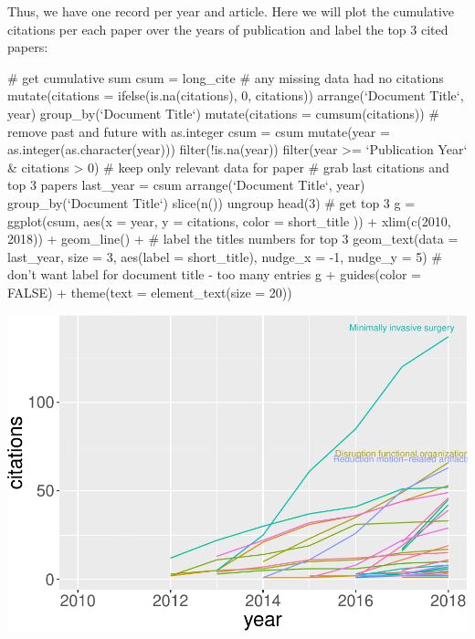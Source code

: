 Thus, we have one record per year and article. Here we will plot the
cumulative citations per each paper over the years of publication and
label the top 3 cited papers:

\begin{Schunk}
\begin{Sinput}
# get cumulative sum
csum = long_cite %
  # any missing data had no citations
  mutate(citations = ifelse(is.na(citations), 0, citations)) %
  arrange(`Document Title`, year) %
  group_by(`Document Title`) %
  mutate(citations = cumsum(citations))
# remove past and future with as.integer
csum = csum %
  mutate(year = as.integer(as.character(year))) %
  filter(!is.na(year)) %
  filter(year >= `Publication Year` & citations > 0) # keep only relevant data for paper
# grab last citations and top 3 papers
last_year = csum %
  arrange(`Document Title`, year) %
  group_by(`Document Title`) %
  slice(n()) %
  ungroup %
  head(3)  # get top 3
g = ggplot(csum, 
           aes(x = year, y = citations, color = short_title  )) +
  xlim(c(2010, 2018)) + geom_line() + 
  # label the titles numbers for top 3
  geom_text(data = last_year, size = 3, aes(label = short_title), 
            nudge_x = -1, nudge_y = 5)
# don't want label for document title - too many entries
g + guides(color = FALSE) + theme(text = element_text(size = 20))
\end{Sinput}

\includegraphics{muschelli_files/figure-latex/unnamed-chunk-28-1} \end{Schunk}

